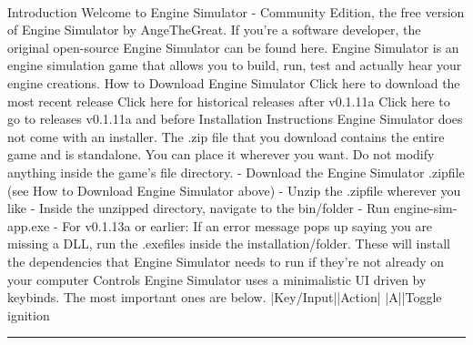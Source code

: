 \documentclass[10pt,a4paper]{article}
\begin{document}
\begin{multicols}{2}
\paragraph{}

Introduction
Welcome to Engine Simulator - Community Edition, the free version of Engine Simulator by AngeTheGreat. If you're a software developer, the original open-source Engine Simulator can be found here.
Engine Simulator is an engine simulation game that allows you to build, run, test and actually hear your engine creations.
How to Download Engine Simulator
Click here to download the most recent release
Click here for historical releases after v0.1.11a
Click here to go to releases v0.1.11a and before
Installation Instructions
Engine Simulator does not come with an installer. The
.zip file that you download contains the entire game and is standalone. You can place it wherever you want. Do not modify anything inside the game's file directory.
- Download the Engine Simulator
.zipfile (see How to Download Engine Simulator above)
- Unzip the
.zipfile wherever you like
- Inside the unzipped directory, navigate to the
bin/folder
- Run
engine-sim-app.exe
- For v0.1.13a or earlier: If an error message pops up saying you are missing a DLL, run the
.exefiles inside the
installation/folder. These will install the dependencies that Engine Simulator needs to run if they're not already on your computer
Controls
Engine Simulator uses a minimalistic UI driven by keybinds. The most important ones are below.
|Key/Input||Action|
|A||Toggle ignition
\par\noindent\textcolor{red}{\rule{\linewidth}{0.2mm}}
\vfill
\null
\end{multicols}

\newpage
\end{document}
